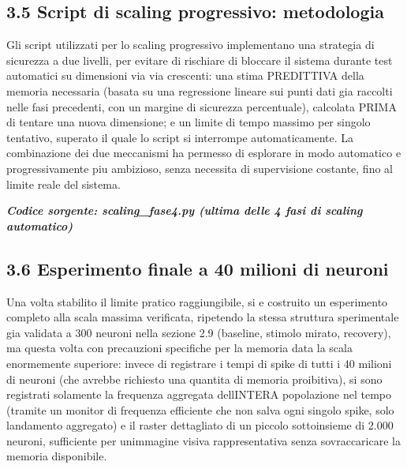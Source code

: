 \documentclass[
  italian,
]{article}
\begin{document}
\subsection{3.5 Script di scaling progressivo: metodologia}\label{script-di-scaling-progressivo-metodologia}

Gli script utilizzati per lo scaling progressivo implementano una strategia di sicurezza a due livelli, per evitare di rischiare di bloccare il sistema durante test automatici su dimensioni via via crescenti: una stima PREDITTIVA della memoria necessaria (basata su una regressione lineare sui punti dati gia\textquotesingle{} raccolti nelle fasi precedenti, con un margine di sicurezza percentuale), calcolata PRIMA di tentare una nuova dimensione; e un limite di tempo massimo per singolo tentativo, superato il quale lo script si interrompe automaticamente. La combinazione dei due meccanismi ha permesso di esplorare in modo automatico e progressivamente piu\textquotesingle{} ambizioso, senza necessita\textquotesingle{} di supervisione costante, fino al limite reale del sistema.

\textit{\textbf{Codice sorgente: scaling\_\allowbreak{}fase4.py (ultima delle 4 fasi di scaling automatico)}}


\subsection{3.6 Esperimento finale a 40 milioni di neuroni}\label{esperimento-finale-a-40-milioni-di-neuroni}

Una volta stabilito il limite pratico raggiungibile, si e\textquotesingle{} costruito un esperimento completo alla scala massima verificata, ripetendo la stessa struttura sperimentale gia\textquotesingle{} validata a 300 neuroni nella sezione 2.9 (baseline, stimolo mirato, recovery), ma questa volta con precauzioni specifiche per la memoria data la scala enormemente superiore: invece di registrare i tempi di spike di tutti i 40 milioni di neuroni (che avrebbe richiesto una quantita\textquotesingle{} di memoria proibitiva), si sono registrati solamente la frequenza aggregata dell\textquotesingle INTERA popolazione nel tempo (tramite un monitor di frequenza efficiente che non salva ogni singolo spike, solo l\textquotesingle andamento aggregato) e il raster dettagliato di un piccolo sottoinsieme di 2.000 neuroni, sufficiente per un\textquotesingle immagine visiva rappresentativa senza sovraccaricare la memoria disponibile.
\end{document}
